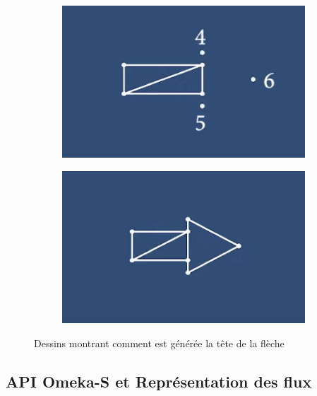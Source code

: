 \begin{figure}[H]

\centering

\begin{subfigure}{0.49\textwidth}
\includegraphics[width=1\linewidth]{assets/unity/screen_point2.png} 
\label{fig:unityPoint2}
\end{subfigure}
\begin{subfigure}{0.49\textwidth}
\includegraphics[width=1\linewidth]{assets/unity/screen_fleche1.png}
\label{fig:dessinFleche1}
\end{subfigure}

\caption{Dessins montrant comment est générée la tête de la flèche}
\label{fig:unityPoint2&Fleche1}
\end{figure}

\subsection{API Omeka-S et Représentation des flux}

